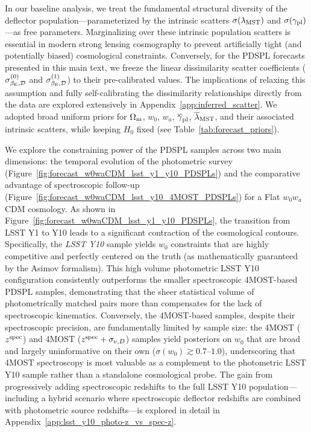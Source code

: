 \documentclass[a4paper,11pt]{article}
\begin{document}
In our baseline analysis, we treat the fundamental structural diversity of the deflector population—parameterized by the intrinsic scatters $\sigma(\lambda_{\rm MST})$ and $\sigma(\gamma_{\rm pl})$—as free parameters. Marginalizing over these intrinsic population scatters is essential in modern strong lensing cosmography to prevent artificially tight (and potentially biased) cosmological constraints. Conversely, for the PDSPL forecasts presented in this main text, we freeze the linear dissimilarity scatter coefficients ($\sigma_{\beta_{\rm E},\rm \mathcal{D}}^{(0)}$ and $\sigma_{\beta_{\rm E},\rm \mathcal{D}}^{(1)}$) to their pre-calibrated values. The implications of relaxing this assumption and fully self-calibrating the dissimilarity relationships directly from the data are explored extensively in Appendix~\ref{app:inferred_scatter}. We adopted broad uniform priors for $\Omega_{\rm m}$, $w_0$, $w_a$, $\overline\gamma_{\rm pl}$, $\overline\lambda_{\rm MST}$, and their associated intrinsic scatters, while keeping $H_0$ fixed (see Table~\ref{tab:forecast_priors}).

We explore the constraining power of the PDSPL samples across two main dimensions: the temporal evolution of the photometric survey (Figure~\ref{fig:forecast_w0waCDM_lsst_y1_y10_PDSPLs}) and the comparative advantage of spectroscopic follow-up (Figure~\ref{fig:forecast_w0waCDM_lsst_y10_4MOST_PDSPLs}) for a Flat $w_0w_a$CDM cosmology. As shown in Figure~\ref{fig:forecast_w0waCDM_lsst_y1_y10_PDSPLs}, the transition from LSST Y1 to Y10 leads to a significant contraction of the cosmological contours. Specifically, the \emph{LSST Y10} sample yields $w_0$ constraints that are highly competitive and perfectly centered on the truth (as mathematically guaranteed by the Asimov formalism). This high volume photometric LSST Y10 configuration consistently outperforms the smaller spectroscopic 4MOST-based PDSPL samples, demonstrating that the sheer statistical volume of photometrically matched pairs more than compensates for the lack of spectroscopic kinematics. Conversely, the 4MOST-based samples, despite their spectroscopic precision, are fundamentally limited by sample size: the 4MOST ($z^{\rm spec}$) and 4MOST ($z^{\rm spec} + \sigma_{v,D}$) samples yield posteriors on $w_0$ that are broad and largely uninformative on their own ($\sigma(w_0) \gtrsim 0.7$--$1.0$), underscoring that 4MOST spectroscopy is most valuable as a complement to the photometric LSST Y10 sample rather than a standalone cosmological probe. The gain from progressively adding spectroscopic redshifts to the full LSST Y10 population—including a hybrid scenario where spectroscopic deflector redshifts are combined with photometric source redshifts—is explored in detail in Appendix~\ref{app:lsst_y10_photo-z_vs_spec-z}.
\end{document}
